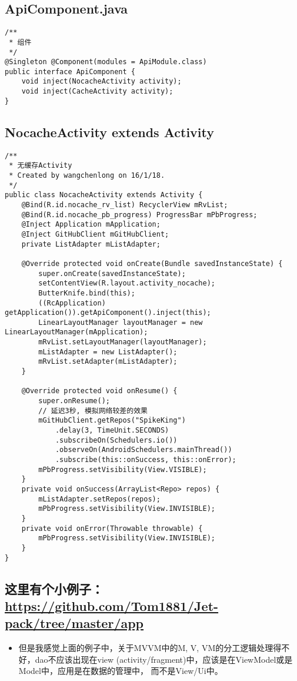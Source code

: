 \documentclass[9pt, b5paper]{article}
\begin{document}
\subsection{ApiComponent.java}
\label{sec-3-3}
\begin{verbatim}
/**
 * 组件
 */
@Singleton @Component(modules = ApiModule.class)
public interface ApiComponent {
    void inject(NocacheActivity activity);
    void inject(CacheActivity activity);
}
\end{verbatim}
\subsection{NocacheActivity extends Activity}
\label{sec-3-4}
\begin{verbatim}
/**
 * 无缓存Activity
 * Created by wangchenlong on 16/1/18.
 */
public class NocacheActivity extends Activity {
    @Bind(R.id.nocache_rv_list) RecyclerView mRvList;
    @Bind(R.id.nocache_pb_progress) ProgressBar mPbProgress;
    @Inject Application mApplication;
    @Inject GitHubClient mGitHubClient;
    private ListAdapter mListAdapter;

    @Override protected void onCreate(Bundle savedInstanceState) {
        super.onCreate(savedInstanceState);
        setContentView(R.layout.activity_nocache);
        ButterKnife.bind(this);
        ((RcApplication) getApplication()).getApiComponent().inject(this);
        LinearLayoutManager layoutManager = new LinearLayoutManager(mApplication);
        mRvList.setLayoutManager(layoutManager);
        mListAdapter = new ListAdapter();
        mRvList.setAdapter(mListAdapter);
    }

    @Override protected void onResume() {
        super.onResume();
        // 延迟3秒, 模拟网络较差的效果
        mGitHubClient.getRepos("SpikeKing")
            .delay(3, TimeUnit.SECONDS)
            .subscribeOn(Schedulers.io())
            .observeOn(AndroidSchedulers.mainThread())
            .subscribe(this::onSuccess, this::onError);
        mPbProgress.setVisibility(View.VISIBLE);
    }
    private void onSuccess(ArrayList<Repo> repos) {
        mListAdapter.setRepos(repos);
        mPbProgress.setVisibility(View.INVISIBLE);
    }
    private void onError(Throwable throwable) {
        mPbProgress.setVisibility(View.INVISIBLE);
    }
}
\end{verbatim}
\subsection{这里有个小例子： \url{https://github.com/Tom1881/Jet-pack/tree/master/app}}
\label{sec-3-5}
\begin{itemize}
\item 但是我感觉上面的例子中，关于MVVM中的M, V, VM的分工逻辑处理得不好，dao不应该出现在view (activity/fragment)中，应该是在ViewModel或是Model中，应用是在数据的管理中， 而不是View/Ui中。
\end{itemize}
\end{document}
